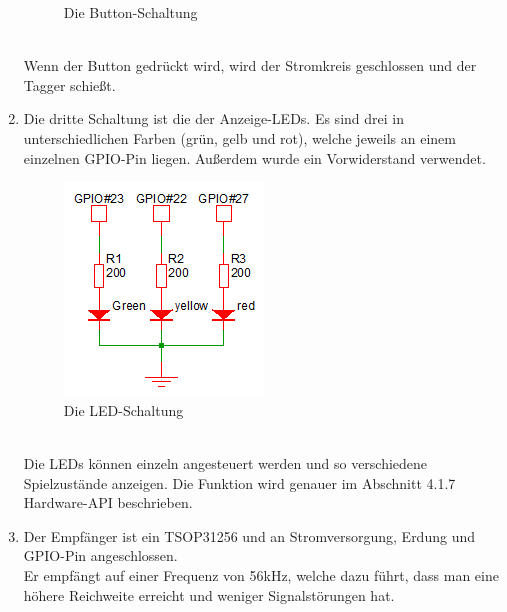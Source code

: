 \begin{enumerate}
\begin{figure}[h]
		\caption{Die Button-Schaltung}
		\label{fig:Bild3Hardware}
	\end{figure}\\
	Wenn der Button gedrückt wird, wird der Stromkreis geschlossen und der Tagger schießt.
	\item Die dritte Schaltung ist die der Anzeige-LEDs. Es sind drei in unterschiedlichen Farben (grün, gelb und rot), welche jeweils an einem einzelnen GPIO-Pin liegen. Außerdem wurde ein Vorwiderstand verwendet.\\
	\begin{figure}[h]
		\centering
		\includegraphics[with=0.2 \textwidth]{./040-komponenten/010-hardware/LEDschaltung.png}
		\caption{Die LED-Schaltung}
		\label{fig:Bild4Hardware}
	\end{figure}\\
	Die LEDs können einzeln angesteuert werden und so verschiedene Spielzustände anzeigen. Die Funktion wird genauer im Abschnitt 4.1.7 Hardware-API beschrieben.
	\item Der Empfänger ist ein TSOP31256 und an Stromversorgung, Erdung und GPIO-Pin angeschlossen.\\
	Er empfängt auf einer Frequenz von 56kHz, welche dazu führt, dass man eine höhere Reichweite erreicht und weniger Signalstörungen hat.
	
	
	

	
	
	
	
	
\end{enumerate}